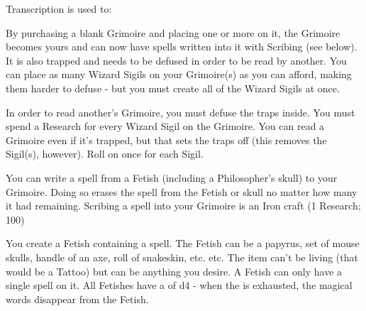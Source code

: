 {

Transcription is used to: 


By purchasing a blank Grimoire and placing one or more  on it, the Grimoire becomes yours and can now have spells written into it with Scribing (see below).  It is also trapped and needs to be defused in order to be read by another.   You can place as many Wizard Sigils on your Grimoire(s) as you can afford, making them harder to defuse - but you must create all of the Wizard Sigils at once.


In order to read another's Grimoire, you must defuse the traps inside.  You must spend a Research for every Wizard Sigil on the Grimoire.  You can read a Grimoire even if it's trapped, but that sets the traps off (this removes the Sigil(s), however).  Roll on  once for each Sigil.


You can write a spell from a Fetish (including a Philosopher's skull) to your Grimoire.  Doing so erases the spell from the Fetish or skull no matter how many \UD it had remaining.  Scribing a spell into your Grimoire is an Iron craft (1 Research; 100\FE)


You create a Fetish containing a spell.  The Fetish can be a papyrus, set of mouse skulls, handle of an axe, roll of snakeskin, etc. etc.  The item can't be living (that would be a Tattoo) but can be anything you desire.  A Fetish can only have a single spell on it.  All Fetishes have a \UD of d4 - when the \UD is exhausted, the magical words disappear from the Fetish. 

}
